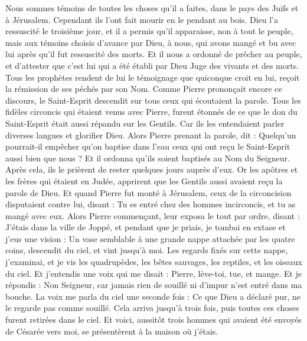 \begin{multicols}{2}
{Nous sommes témoins de toutes les choses qu'il a faites, dans le pays des Juifs et à Jérusalem. Cependant ils l'ont fait mourir en le pendant au bois.
Dieu l'a ressuscité le troisième jour, et il a permis qu'il apparaisse,
non à tout le peuple, mais aux témoins choisis d'avance par Dieu, à nous, qui avons mangé et bu avec lui après qu'il fut ressuscité des morts.
Et il nous a ordonné de prêcher au peuple, et d'attester que c'est lui qui a été établi par Dieu Juge des vivants et des morts.
Tous les prophètes rendent de lui le témoignage que quiconque croit en lui, reçoit la rémission de ses péchés par son Nom.
Comme Pierre prononçait encore ce discours, le Saint-Esprit descendit sur tous ceux qui écoutaient la parole.
Tous les fidèles circoncis qui étaient venus avec Pierre, furent étonnés de ce que le don du Saint-Esprit était aussi répandu sur les Gentils.
Car ils les entendaient parler diverses langues et glorifier Dieu.
Alors Pierre prenant la parole, dit : Quelqu'un pourrait-il empêcher qu'on baptise dans l'eau ceux qui ont reçu le Saint-Esprit aussi bien que nous ?
Et il ordonna qu'ils soient baptisés au Nom du Seigneur. Après cela, ils le prièrent de rester quelques jours auprès d'eux.
\VerseOne{}Or les apôtres et les frères qui étaient en Judée, apprirent que les Gentils aussi avaient reçu la parole de Dieu.
Et quand Pierre fut monté à Jérusalem, ceux de la circoncision disputaient contre lui,
disant : Tu es entré chez des hommes incirconcis, et tu as mangé avec eux.
Alors Pierre commençant, leur exposa le tout par ordre, disant :
J'étais dans la ville de Joppé, et pendant que je priais, je tombai en extase et j'eus une vision : Un vase semblable à une grande nappe attachée par les quatre coins, descendit du ciel, et vint jusqu'à moi.
Les regards fixés sur cette nappe, j'examinai, et je vis les quadrupèdes, les bêtes sauvages, les reptiles, et les oiseaux du ciel.
Et j'entendis une voix qui me disait : Pierre, lève-toi, tue, et mange.
Et je répondis : Non Seigneur, car jamais rien de souillé ni d'impur n'est entré dans ma bouche.
La voix me parla du ciel une seconde fois : Ce que Dieu a déclaré pur, ne le regarde pas comme souillé.
Cela arriva jusqu'à trois fois, puis toutes ces choses furent retirées dans le ciel.
Et voici, aussitôt trois hommes qui avaient été envoyés de Césarée vers moi, se présentèrent à la maison où j'étais.
}
\end{multicols}
